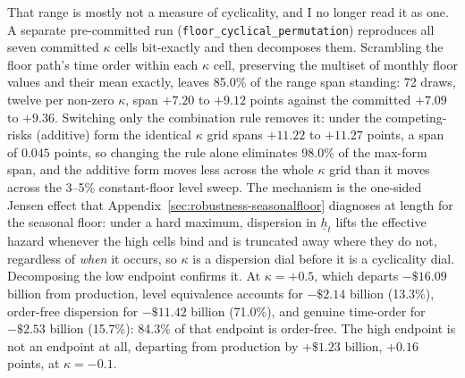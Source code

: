 \documentclass[12pt]{article}
\begin{document}
That range is mostly not a measure of cyclicality, and I no longer read it as one. A separate pre-committed run (\texttt{floor\_cyclical\_permutation}) reproduces all seven committed $\kappa$ cells bit-exactly and then decomposes them. Scrambling the floor path's time order within each $\kappa$ cell, preserving the multiset of monthly floor values and their mean exactly, leaves 85.0\% of the range span standing: 72 draws, twelve per non-zero $\kappa$, span $+7.20$ to $+9.12$ points against the committed $+7.09$ to $+9.36$. Switching only the combination rule removes it: under the competing-risks (additive) form the identical $\kappa$ grid spans $+11.22$ to $+11.27$ points, a span of $0.045$ points, so changing the rule alone eliminates 98.0\% of the max-form span, and the additive form moves less across the whole $\kappa$ grid than it moves across the 3--5\% constant-floor level sweep. The mechanism is the one-sided Jensen effect that Appendix~\ref{sec:robustness-seasonalfloor} diagnoses at length for the seasonal floor: under a hard maximum, dispersion in $\underline{h}_t$ lifts the effective hazard whenever the high cells bind and is truncated away where they do not, regardless of \emph{when} it occurs, so $\kappa$ is a dispersion dial before it is a cyclicality dial. Decomposing the low endpoint confirms it. At $\kappa = +0.5$, which departs $-\$16.09$ billion from production, level equivalence accounts for $-\$2.14$ billion (13.3\%), order-free dispersion for $-\$11.42$ billion (71.0\%), and genuine time-order for $-\$2.53$ billion (15.7\%): 84.3\% of that endpoint is order-free. The high endpoint is not an endpoint at all, departing from production by $+\$1.23$ billion, $+0.16$ points, at $\kappa = -0.1$.
\end{document}
